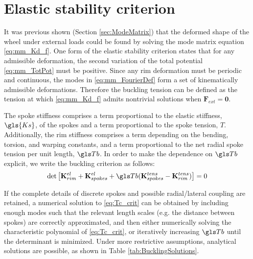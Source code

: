 \documentclass[\rootdir/thesis.tex]{subfiles}
\begin{document}
\section{Elastic stability criterion}
It was previous shown (Section \ref{sec:ModeMatrix}) that the deformed shape of the wheel under external loads could be found by solving the mode matrix equation \eqref{eq:mm_Kd_f}. One form of the elastic stability criterion states that for any admissible deformation, the second variation of the total potential \eqref{eq:mm_TotPot} must be positive. Since any rim deformation must be periodic and continuous, the modes in \eqref{eq:mm_FourierDef} form a set of kinematically admissible deformations. Therefore the buckling tension can be defined as the tension at which \eqref{eq:mm_Kd_f} admits nontrivial solutions when $\mathbf{F}_{ext}=\mathbf{0}.$

The spoke stiffness comprises a term proportional to the elastic stiffness, $\gls{Ks}$, of the spokes and a term proportional to the spoke tension, $T$. Additionally, the rim stiffness comprises a term depending on the bending, torsion, and warping constants, and a term proportional to the net radial spoke tension per unit length, $\Tb$. In order to make the dependence on $\Tb$ explicit, we write the buckling criterion as follows:
\begin{equation}
\label{eq:Tc_crit}
\det{\left[\mathbf{K}_{rim}^{el} + \mathbf{K}_{spokes}^{el} + \Tb(\mathbf{K}_{spokes}^{tens} - \mathbf{K}_{rim}^{tens})\right]} = 0
\end{equation}

If the complete details of discrete spokes and possible radial/lateral coupling are retained, a numerical solution to \eqref{eq:Tc_crit} can be obtained by including enough modes such that the relevant length scales (e.g. the distance between spokes) are correctly approximated, and then either numerically solving the characteristic polynomial of \eqref{eq:Tc_crit}, or iteratively increasing $\Tb$ until the determinant is minimized. Under more restrictive assumptions, analytical solutions are possible, as shown in Table \ref{tab:BucklingSolutions}.
\end{document}
